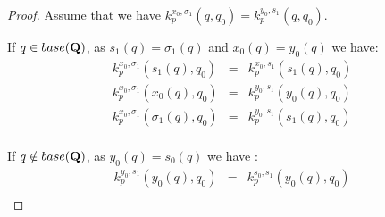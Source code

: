 \begin{proof}
	Assume that we have $k^{x_0,\sigma_1}_p(q,q_0) = k^{y_0,s_1}_p(q,q_0)$. 
	
	If $q \in base(\mathbf{Q})$, as $s_1(q) = \sigma_1(q)$ and $x_0(q) = y_0(q)$ we have:
	\begin{eqnarray*}
		k^{x_0,\sigma_1}_p(s_1(q),q_0) & =  &k^{x_0,s_1}_p(s_1(q),q_0) \\
		k^{x_0,\sigma_1}_p(x_0(q),q_0) &= & k^{y_0,s_1}_p(y_0(q),q_0) \\
		k^{x_0,\sigma_1}_p(\sigma_1(q),q_0) &= &k^{y_0,s_1}_p(s_1(q),q_0) \\
	\end{eqnarray*}
	
	If $q \notin base(\mathbf{Q})$, as $y_0(q) = s_0(q)$ we have :
	\begin{eqnarray*}
		k^{y_0,s_1}_p(y_0(q),q_0) &= & k^{s_0,s_1}_p(y_0(q),q_0) \\
	\end{eqnarray*}
	

\end{proof}
